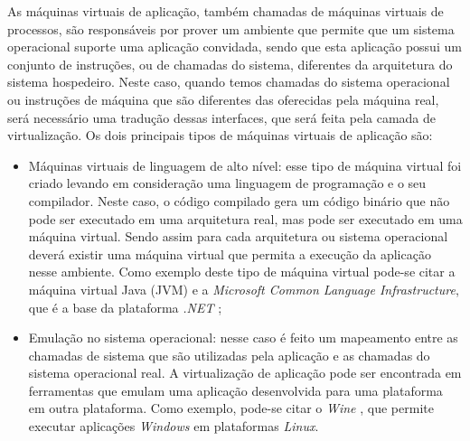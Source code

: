 As máquinas virtuais de aplicação, também chamadas de máquinas virtuais de processos, são responsáveis por prover um ambiente que permite 
que um sistema operacional suporte uma aplicação convidada, sendo que esta aplicação possui um conjunto de instruções, ou de chamadas
do sistema, diferentes da arquitetura do sistema hospedeiro. Neste caso, quando temos chamadas do sistema operacional ou instruções de máquina 
que são diferentes das oferecidas pela máquina real, será necessário uma tradução dessas interfaces, que será feita pela camada de 
virtualização. Os dois principais tipos de máquinas virtuais de aplicação são:

\begin{itemize}
 \item Máquinas virtuais de linguagem de alto nível: esse tipo de máquina virtual foi criado levando em consideração uma linguagem de 
 programação e o seu compilador. Neste caso, o código compilado gera um código binário que não pode ser executado em uma arquitetura real, 
 mas pode ser executado em uma máquina virtual. Sendo assim para cada arquitetura ou sistema operacional deverá existir uma máquina virtual que
 permita a execução da aplicação nesse ambiente. Como exemplo deste tipo de máquina virtual pode-se citar a máquina virtual Java (\ac{JVM})
 e a \textit{Microsoft Common Language Infrastructure}, que é a base da plataforma \textit{.NET} \cite{carissimi2008};
 \item Emulação no sistema operacional: nesse caso é feito um mapeamento entre as chamadas de sistema que são utilizadas pela aplicação 
 e as chamadas do sistema operacional real. A virtualização de aplicação pode ser encontrada em ferramentas que emulam uma aplicação 
 desenvolvida para uma plataforma em outra plataforma. Como exemplo, pode-se citar o \textit{Wine} \cite{wine}, que permite executar aplicações 
 \textit{Windows} em plataformas \textit{Linux}.
\end{itemize}


